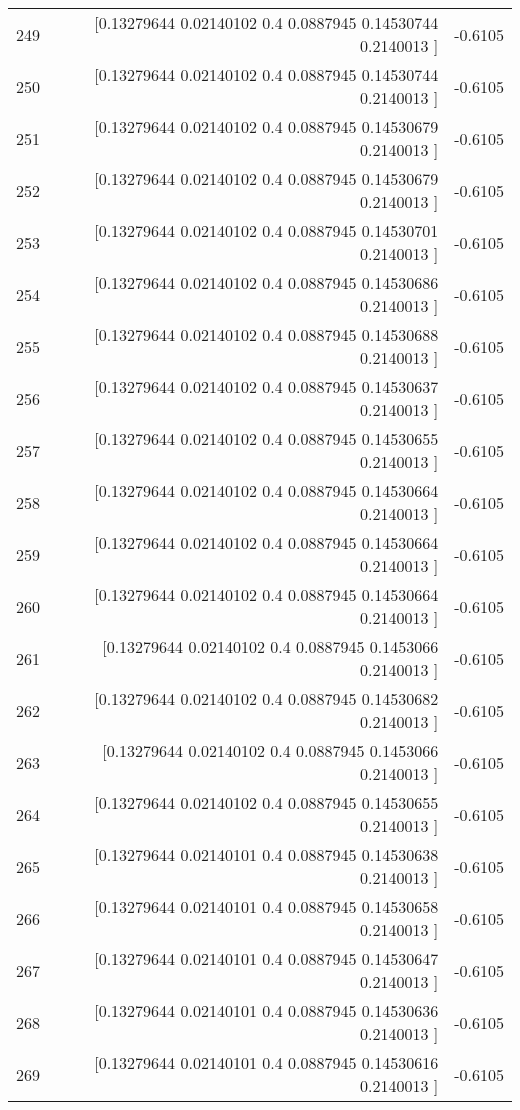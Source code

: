 \begin{longtable}{lrr}
249 & [0.13279644 0.02140102 0.4        0.0887945  0.14530744 0.2140013 ] & -0.6105 \\
250 & [0.13279644 0.02140102 0.4        0.0887945  0.14530744 0.2140013 ] & -0.6105 \\
251 & [0.13279644 0.02140102 0.4        0.0887945  0.14530679 0.2140013 ] & -0.6105 \\
252 & [0.13279644 0.02140102 0.4        0.0887945  0.14530679 0.2140013 ] & -0.6105 \\
253 & [0.13279644 0.02140102 0.4        0.0887945  0.14530701 0.2140013 ] & -0.6105 \\
254 & [0.13279644 0.02140102 0.4        0.0887945  0.14530686 0.2140013 ] & -0.6105 \\
255 & [0.13279644 0.02140102 0.4        0.0887945  0.14530688 0.2140013 ] & -0.6105 \\
256 & [0.13279644 0.02140102 0.4        0.0887945  0.14530637 0.2140013 ] & -0.6105 \\
257 & [0.13279644 0.02140102 0.4        0.0887945  0.14530655 0.2140013 ] & -0.6105 \\
258 & [0.13279644 0.02140102 0.4        0.0887945  0.14530664 0.2140013 ] & -0.6105 \\
259 & [0.13279644 0.02140102 0.4        0.0887945  0.14530664 0.2140013 ] & -0.6105 \\
260 & [0.13279644 0.02140102 0.4        0.0887945  0.14530664 0.2140013 ] & -0.6105 \\
261 & [0.13279644 0.02140102 0.4        0.0887945  0.1453066  0.2140013 ] & -0.6105 \\
262 & [0.13279644 0.02140102 0.4        0.0887945  0.14530682 0.2140013 ] & -0.6105 \\
263 & [0.13279644 0.02140102 0.4        0.0887945  0.1453066  0.2140013 ] & -0.6105 \\
264 & [0.13279644 0.02140102 0.4        0.0887945  0.14530655 0.2140013 ] & -0.6105 \\
265 & [0.13279644 0.02140101 0.4        0.0887945  0.14530638 0.2140013 ] & -0.6105 \\
266 & [0.13279644 0.02140101 0.4        0.0887945  0.14530658 0.2140013 ] & -0.6105 \\
267 & [0.13279644 0.02140101 0.4        0.0887945  0.14530647 0.2140013 ] & -0.6105 \\
268 & [0.13279644 0.02140101 0.4        0.0887945  0.14530636 0.2140013 ] & -0.6105 \\
269 & [0.13279644 0.02140101 0.4        0.0887945  0.14530616 0.2140013 ] & -0.6105 \\

\end{longtable}
